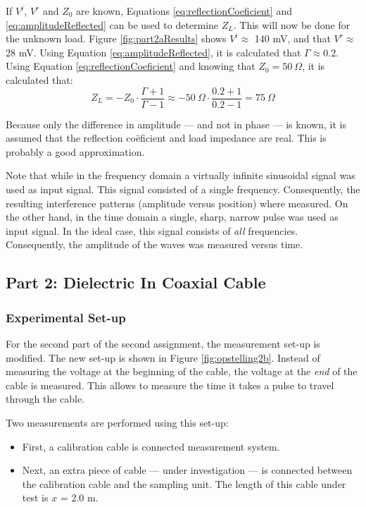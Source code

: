 \documentclass[11pt,a4paper]{article}
\begin{document}
If $V^i$, $V^r$ and $Z_0$ are known, Equations \ref{eq:reflectionCoeficient} and \ref{eq:amplitudeReflected} can be used to determine $Z_L$. This will now be done for the unknown load.
Figure \ref {fig:part2aResults} shows $V^i \approx$ 140 mV, and that $V^r \approx$ 28 mV. Using Equation \ref{eq:amplitudeReflected}, it is calculated that $\Gamma\approx 0.2$. Using Equation \ref{eq:reflectionCoeficient} and knowing that $Z_0 = 50 \ \Omega$, it is calculated that:
\begin{equation}
Z_L = - Z_0 \cdot \frac{\Gamma + 1}{\Gamma - 1} \approx - 50 \ \Omega \cdot \frac{0.2 + 1}{0.2 -1} = 75 \ \Omega
\end{equation}

Because only the difference in amplitude --- and not in phase --- is known, it is assumed that the reflection co\"eficient and load impedance are real.
This is probably a good approximation.

Note that while in the frequency domain a virtually infinite sinusoidal signal was used as input signal. This signal consisted of a single frequency.
Consequently, the resulting interference patterns (amplitude versus position) where measured.
On the other hand, in the time domain a single, sharp, narrow pulse was used as input signal. In the ideal case, this signal consists of \emph{all} frequencies.
Consequently, the amplitude of the waves was measured versus time.

\subsection{Part 2: Dielectric In Coaxial Cable}
\subsubsection{Experimental Set-up}
For the second part of the second assignment, the measurement set-up is modified. The new set-up is shown in Figure \ref{fig:opstelling2b}. Instead of measuring the voltage at the beginning of the cable, the voltage at the \emph{end} of the cable is measured. This allows to measure the time it takes a pulse to travel through the cable.

Two measurements are performed using this set-up:
\begin{itemize}
\item First, a calibration cable is connected measurement system.
\item Next, an extra piece of cable --- under investigation --- is connected between the calibration cable and the sampling unit. The length of this cable under test is $x$ = 2.0 m.
\end{itemize}
\end{document}
